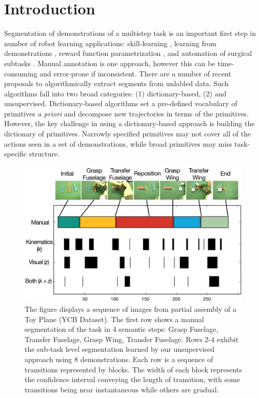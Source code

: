 \section{Introduction}
Segmentation of demonstrations of a multistep task is an important first step in number of robot learning applications: skill-learning \cite{calinon2010learning, kruger2010learning, konidaris2011robot}, learning from demonstrations \cite{Niekum2015learning}, reward function parametrization \cite{hanlearning}, and automation of surgical subtasks \cite{murali2015learning}.
Manual annotation is one approach, however this can be time-consuming and error-prone if inconsistent.
There are a number of recent proposals to algorithmically extract segments from unlabled data.
Such algorithms fall into two broad categories: (1) dictionary-based, (2) and unsupervised.
Dictionary-based algorithms set a pre-defined vocabulary of primitives \emph{a priori} and decompose new trajectories in terms of the primitives.
However, the key challenge in using a dictionary-based approach is building the dictionary of primitives. 
Narrowly specified primitives may not cover all of the actions seen in a set of demonstrations, while broad primitives may miss task-specific structure.

\begin{figure}[t!]
\centering
\includegraphics[width=\linewidth]{figures/pr2_plane_assembly.png}
\caption{The figure displays a sequence of images from partial assembly of a Toy Plane (YCB Dataset). The first row shows a manual segmentation of the task in 4 semantic steps: Grasp Fuselage, Transfer Fuselage, Grasp Wing, Transfer Fuselage. Rows 2-4 exhibit the sub-task level segmentation learned by our  unsupervised approach using 8 demonstrations. Each row is a sequence of transitions represented by blocks. The width of each block represents the confidence interval conveying the length of transition, with some transitions being near instantaneous while others are gradual.}
\vspace{-15pt} 
\end{figure}


